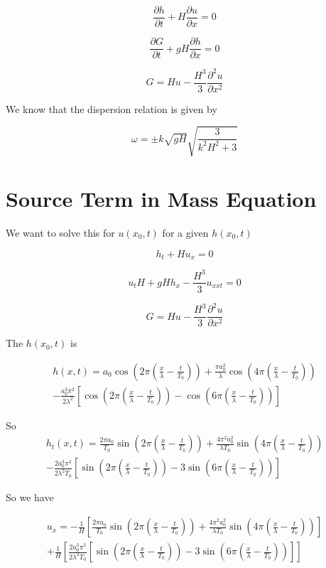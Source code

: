 \documentclass[12pt]{article}
\begin{document}
\[\frac{\partial  h}{\partial  t} + H\frac{\partial  u}{\partial  x} = 0 \]

\[\frac{\partial  G}{\partial  t} + gH\frac{\partial  h}{\partial  x}   = 0 \]

\[G = Hu -\frac{H^3}{3} \frac{\partial^2 u}{\partial x^2}\]

We know that the dispersion relation is given by

\[\omega =  \pm k\sqrt{gH}\sqrt{\frac{3}{k^2H^2 + 3}}\]

\section{Source Term in Mass Equation}

We want to solve this for $u(x_0,t)$ for a given $h(x_0,t)$

\[h_t + Hu_x = 0 \]

\[u_tH + gHh_x - \frac{H^3}{3} u_{xxt}   = 0 \]

\[G = Hu -\frac{H^3}{3} \frac{\partial^2 u}{\partial x^2}\]


The $h(x_0,t)$ is

\begin{multline}
h(x,t)= a_0 \cos\left(2 \pi \left(\frac{x}{\lambda} - \frac{t}{T_0}\right)\right) + \frac{\pi a_0^2}{\lambda} \cos\left(4 \pi \left(\frac{x}{\lambda} - \frac{t}{T_0}\right)\right) \\ - \frac{a_0^3 \pi^2}{2 \lambda^2} \left[\cos\left(2 \pi \left(\frac{x}{\lambda} - \frac{t}{T_0}\right)\right) - \cos\left(6 \pi \left(\frac{x}{\lambda} - \frac{t}{T_0}\right)\right)\right]
\end{multline}

So 
\begin{multline}
h_t(x,t)= \frac{2\pi a_0}{T_0} \sin\left(2 \pi \left(\frac{x}{\lambda} - \frac{t}{T_0}\right)\right) + \frac{4\pi^2 a_0^2}{\lambda T_0} \sin\left(4 \pi \left(\frac{x}{\lambda} - \frac{t}{T_0}\right)\right) \\ - \frac{2a_0^3 \pi^3}{2 \lambda^2 T_0} \left[\sin\left(2 \pi \left(\frac{x}{\lambda} - \frac{t}{T_0}\right)\right) - 3\sin\left(6 \pi \left(\frac{x}{\lambda} - \frac{t}{T_0}\right)\right)\right]
\end{multline}

So we have

\begin{multline}
u_x = -\frac{1}{H}\left[\frac{2\pi a_0}{T_0} \sin\left(2 \pi \left(\frac{x}{\lambda} - \frac{t}{T_0}\right)\right) + \frac{4\pi^2 a_0^2}{\lambda T_0} \sin\left(4 \pi \left(\frac{x}{\lambda} - \frac{t}{T_0}\right)\right) \right] \\ +\frac{1}{H}\left[ \frac{2a_0^3 \pi^3}{2 \lambda^2 T_0} \left[\sin\left(2 \pi \left(\frac{x}{\lambda} - \frac{t}{T_0}\right)\right) - 3\sin\left(6 \pi \left(\frac{x}{\lambda} - \frac{t}{T_0}\right)\right)\right]\right]
\end{multline}
\end{document}
